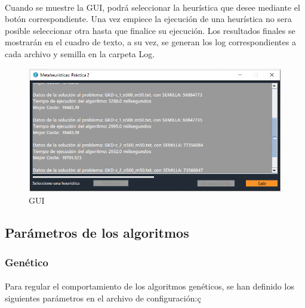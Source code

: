 		\paragraph{}Cuando se muestre la GUI, podrá seleccionar la heurística que desee mediante el botón correspondiente. Una vez empiece la ejecución de una heurística no sera posible seleccionar otra hasta que finalice su ejecución. Los resultados finales se mostrarán en el cuadro de texto, a su vez, se generan los log correspondientes a cada archivo y semilla en la carpeta Log.
	
		\begin{figure}[H]
		
			\centering
			\includegraphics[scale=0.4]{img/GUI}
			\caption{GUI}
		
		\end{figure}
	
	\subsection{Parámetros de los algoritmos}
	
		\subsubsection{Genético}
		\paragraph{}Para regular el comportamiento de los algoritmos genéticos, se han definido los siguientes parámetros en el archivo de configuración:ç
		
